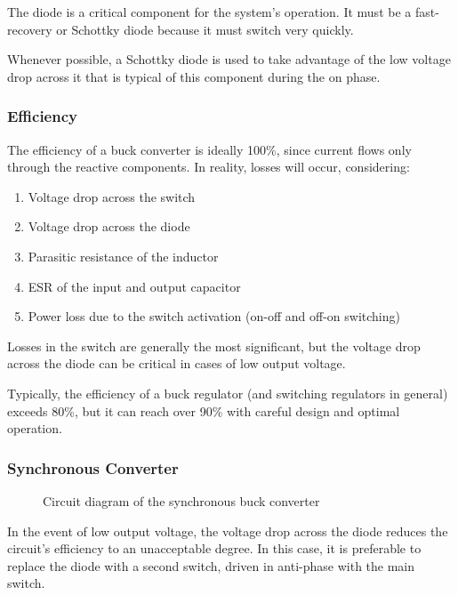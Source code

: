 \documentclass[../main.tex]{subfiles}
\begin{document}
The diode is a critical component for the system’s operation. It must be a fast-recovery or Schottky diode because it must switch very quickly. 

Whenever possible, a Schottky diode is used to take advantage of the low voltage drop across it that is typical of this component during the on phase.


\subsubsection*{Efficiency}


The efficiency of a buck converter is ideally 100\%, since current flows only through the reactive components. In reality, losses will occur, considering:

\begin{enumerate}[label=\textbf{-}]
	\item Voltage drop across the switch
	\item Voltage drop across the diode
	\item Parasitic resistance of the inductor
	\item ESR of the input and output capacitor
	\item Power loss due to the switch activation (on-off and off-on switching)
\end{enumerate}

Losses in the switch are generally the most significant, but the voltage drop
across the diode can be critical in cases of low output voltage. 

Typically,
the efficiency of a buck regulator (and switching regulators in general) exceeds 80\%, but it can reach over 90\% with careful design and optimal operation.


\subsubsection*{Synchronous Converter}


\begin{figure}[h!]
\begin{center}


\label{synconv}
\caption{Circuit diagram of the synchronous buck converter}	
\end{center}
\end{figure}



In the event of low output voltage, the voltage drop across the diode reduces the circuit’s efficiency to an unacceptable degree. In this case, it is preferable to replace the diode with a second switch, driven in anti-phase with the main switch. 
\end{document}
